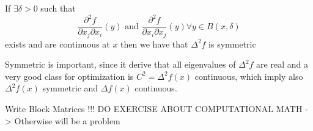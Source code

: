 \begin{thm}
	If $\exists \delta > 0$ such that 
	\[ \frac{\partial^2 f}{\partial x_j \partial x_i}(y) \text{ and }
	   \frac{\partial^2 f}{\partial x_i \partial x_j}(y) \forall y \in B(x, \delta) \]
	exists and are continuous at $x$ then we have that $\Delta^2 f$ is symmetric
\end{thm}
Symmetric is important, since it derive that all eigenvalues of $\Delta^2 f$ are real and a very
good class for optimization is $C^2 = \Delta^2 f(x)$ continuous, which imply also $\Delta^2 f(x)$
symmetric and $\Delta f(x)$ continuous.





Write Block Matrices !!!
DO EXERCISE ABOUT COMPUTATIONAL MATH -> Otherwise will be a problem


